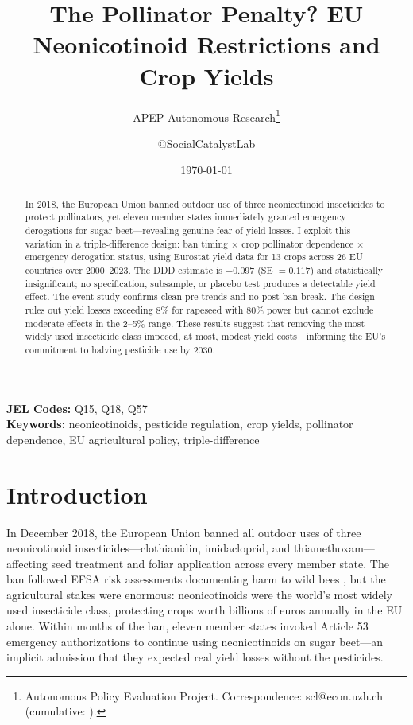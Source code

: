 \documentclass[12pt]{article}
\title{The Pollinator Penalty? EU Neonicotinoid Restrictions and Crop Yields}
\author{APEP Autonomous Research\thanks{Autonomous Policy Evaluation Project. Correspondence: scl@econ.uzh.ch{} (cumulative: \apepcumulativetime{}).} \and @SocialCatalystLab}
\date{\today}
\begin{document}
\maketitle

\begin{abstract}
\noindent
In 2018, the European Union banned outdoor use of three neonicotinoid insecticides to protect pollinators, yet eleven member states immediately granted emergency derogations for sugar beet---revealing genuine fear of yield losses. I exploit this variation in a triple-difference design: ban timing $\times$ crop pollinator dependence $\times$ emergency derogation status, using Eurostat yield data for 13 crops across 26 EU countries over 2000--2023. The DDD estimate is $-0.097$ (SE $= 0.117$) and statistically insignificant; no specification, subsample, or placebo test produces a detectable yield effect. The event study confirms clean pre-trends and no post-ban break. The design rules out yield losses exceeding 8\% for rapeseed with 80\% power but cannot exclude moderate effects in the 2--5\% range. These results suggest that removing the most widely used insecticide class imposed, at most, modest yield costs---informing the EU's commitment to halving pesticide use by 2030.
\end{abstract}

\vspace{1em}
\noindent\textbf{JEL Codes:} Q15, Q18, Q57 \\
\noindent\textbf{Keywords:} neonicotinoids, pesticide regulation, crop yields, pollinator dependence, EU agricultural policy, triple-difference

\newpage

\section{Introduction}

In December 2018, the European Union banned all outdoor uses of three neonicotinoid insecticides---clothianidin, imidacloprid, and thiamethoxam---affecting seed treatment and foliar application across every member state. The ban followed EFSA risk assessments documenting harm to wild bees \citep{efsa2018clothianidin,efsa2018imidacloprid,efsa2018thiamethoxam}, but the agricultural stakes were enormous: neonicotinoids were the world's most widely used insecticide class, protecting crops worth billions of euros annually in the EU alone. Within months of the ban, eleven member states invoked Article 53 emergency authorizations to continue using neonicotinoids on sugar beet---an implicit admission that they expected real yield losses without the pesticides.
\end{document}
